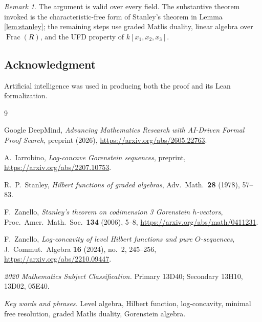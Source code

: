 \documentclass[11pt]{article}
\theoremstyle{remark}
\newtheorem*{remark}{Remark}
\newcommand{\Frac}{\operatorname{Frac}}
\begin{document}
\begin{remark}
The argument is valid over every field. The substantive theorem invoked is
the characteristic-free form of Stanley's theorem in Lemma
\ref{lem:stanley}; the remaining steps use graded Matlis duality, linear
algebra over $\Frac(R)$, and the UFD property of $k[x_1,x_2,x_3]$.
\end{remark}

\subsection*{Acknowledgment}

Artificial intelligence was used in producing both the proof and its Lean
formalization.

\begin{thebibliography}{9}

Google DeepMind,
\emph{Advancing Mathematics Research with AI-Driven Formal Proof Search},
preprint (2026), \url{https://arxiv.org/abs/2605.22763}.

A.\ Iarrobino,
\emph{Log-concave Gorenstein sequences},
preprint, \url{https://arxiv.org/abs/2207.10753}.

R.\ P.\ Stanley,
\emph{Hilbert functions of graded algebras},
Adv.\ Math.\ \textbf{28} (1978), 57--83.

F.\ Zanello,
\emph{Stanley's theorem on codimension 3 Gorenstein $h$-vectors},
Proc.\ Amer.\ Math.\ Soc.\ \textbf{134} (2006), 5--8,
\url{https://arxiv.org/abs/math/0411231}.

F.\ Zanello,
\emph{Log-concavity of level Hilbert functions and pure $O$-sequences},
J.\ Commut.\ Algebra \textbf{16} (2024), no.\ 2, 245--256,
\url{https://arxiv.org/abs/2210.09447}.

\end{thebibliography}

\vspace{1em}
\noindent\emph{2020 Mathematics Subject Classification.}
Primary 13D40; Secondary 13H10, 13D02, 05E40.

\medskip
\noindent\emph{Key words and phrases.}
Level algebra, Hilbert function, log-concavity, minimal free resolution,
graded Matlis duality, Gorenstein algebra.
\end{document}
